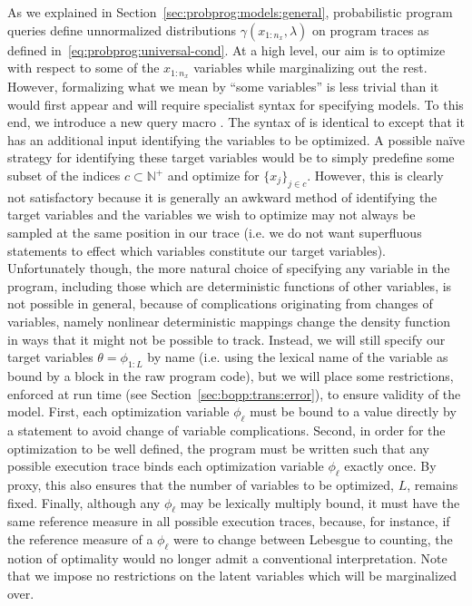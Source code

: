 
As we explained in Section~\ref{sec:probprog:models:general}, probabilistic program queries
define unnormalized distributions $\gamma(x_{1:n_x},\lambda)$ on program traces
 as defined in~\eqref{eq:probprog:universal-cond}.
At a high level, our aim is to optimize with respect to some of the $x_{1:n_x}$ variables while marginalizing out
the rest.  However, formalizing what we mean by ``some variables'' is less trivial than it would
first appear and will require specialist syntax for specifying models.  To this end,
we introduce a new query macro .  The syntax of  is identical to  except 
that it has an additional input identifying the variables to be optimized. 
A possible na\"{i}ve strategy for identifying these target variables
would be to simply predefine some subset of the \sample indices
$c \subset \mathbb{N}^+$ and optimize for $\{x_j \}_{j\in c}$.  However, this is clearly not satisfactory
because it is generally an awkward method of identifying the target variables and the variables we wish
to optimize may not always be sampled at the same position in our trace (i.e. we do not want superfluous
\sample statements to effect which variables constitute our target variables).
Unfortunately though, the more natural choice of specifying any variable in the program, including those
which are deterministic functions of other variables, is not possible in general, because of complications
originating from changes of variables, namely nonlinear deterministic mappings change the density
function in ways that it might not be possible to track.  Instead, we will still specify our target variables
$\theta = \phi_{1:L}$ by name (i.e. using the lexical name of the variable as bound by a  block in
the raw program code), but we will place some restrictions, enforced at run time (see Section~\ref{sec:bopp:trans:error}), 
to ensure validity of the model.  First, each optimization variable $\phi_{\ell}$ must be bound to a value directly 
by a \sample statement to avoid change of variable complications.
Second, in order for the optimization to be well defined, the program must be written such that any 
possible execution trace binds each optimization variable $\phi_{\ell}$ exactly once.  By proxy, this also
ensures that the number of variables to be optimized, $L$, remains fixed.
Finally, although any $\phi_{\ell}$ may be lexically multiply bound, it must have the same reference 
measure in all possible execution traces, because, for instance, if the reference measure of 
a $\phi_{\ell}$ were to change between Lebesgue to counting, the notion of optimality would 
no longer admit a conventional interpretation.  Note that we impose no restrictions on the latent
variables which will be marginalized over.

